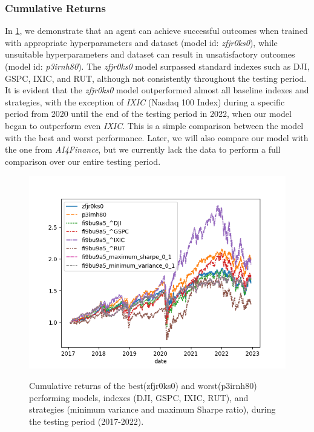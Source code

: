 \documentclass[../xlapes02]{subfiles}
\begin{document}
    \subsubsection{Cumulative Returns}
    In \cref{fig:cumulative_return}, we demonstrate that an agent can achieve successful outcomes when trained with appropriate hyperparameters and dataset (model id: \emph{zfjr0ks0}), while unsuitable hyperparameters and dataset can result in unsatisfactory outcomes (model id: \emph{p3irnh80}). The \emph{zfjr0ks0} model surpassed standard indexes such as DJI, GSPC, IXIC, and RUT, although not consistently throughout the testing period. It is evident that the \emph{zfjr0ks0} model outperformed almost all baseline indexes and strategies, with the exception of \emph{IXIC} (Nasdaq 100 Index) during a specific period from 2020 until the end of the testing period in 2022, when our model began to outperform even \emph{IXIC}. This is a simple comparison between the model with the best and worst performance. Later, we will also compare our model with the one from \emph{AI4Finance}, but we currently lack the data to perform a full comparison over our entire testing period.
    \begin{figure}[h!]
        \centering
        \includegraphics[width=\linewidth]{image/figure/returns}
        \label{fig:cumulative_return}
        \caption{Cumulative returns of the best(zfjr0ks0) and worst(p3irnh80) performing models, indexes (DJI, GSPC, IXIC, RUT), and strategies (minimum variance and maximum Sharpe ratio), during the testing period (2017-2022).}
    \end{figure}
\end{document}
